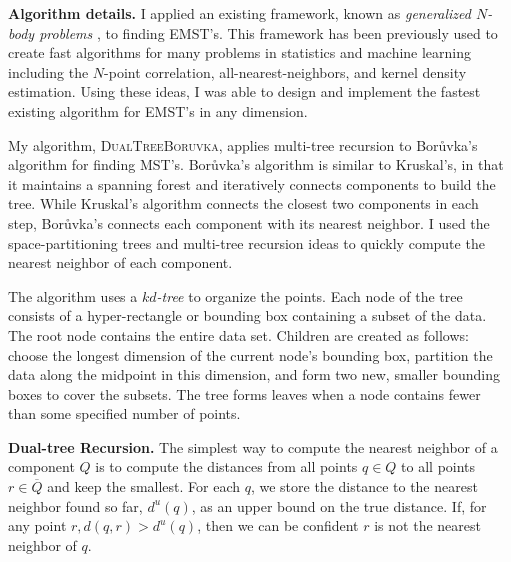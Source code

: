 \documentclass[twoside,leqno, 12pt]{article}
\begin{document}
%



\textbf{Algorithm details.}  I applied an existing framework, known as \emph{generalized $N$-body problems} \cite{gray_nbody}, to finding EMST's.  This framework has been previously used to create fast algorithms for many problems in statistics and machine learning including the $N$-point correlation, all-nearest-neighbors, and kernel density estimation.  Using these ideas, I was able to design and implement the fastest existing algorithm for EMST's in any dimension.  

My algorithm, \textsc{DualTreeBoruvka}, applies multi-tree recursion to Bor\r{u}vka's algorithm for finding MST's.  Bor\r{u}vka's algorithm is similar to Kruskal's, in that it maintains a spanning forest and iteratively connects components to build the tree.  While Kruskal's algorithm connects the closest two components in each step, Bor\r{u}vka's connects each component with its nearest neighbor.  I used the space-partitioning trees and multi-tree recursion ideas to quickly compute the nearest neighbor of each component.  

The algorithm uses a \emph{$kd$-tree} to organize the points.   Each node of the tree consists of a hyper-rectangle or bounding box containing a subset of the data.  The root node contains the entire data set.  Children are created as follows: choose the longest dimension of the current node's bounding box, partition the data along the midpoint in this dimension, and form two new, smaller bounding boxes to cover the subsets.  The tree forms leaves when a node contains fewer than some specified number of points.  

\textbf{Dual-tree Recursion.}  The simplest way to compute the nearest neighbor of a component $Q$ is to compute the distances from all points $q \in Q$ to all points $r \in \overline{Q}$ and keep the smallest.  For each $q$, we store the distance to the nearest neighbor found so far, $d^u(q)$, as an upper bound on the true distance.  If, for any point $r, d(q, r) > d^u(q)$, then we can be confident $r$ is not the nearest neighbor of $q$. 
\end{document}
